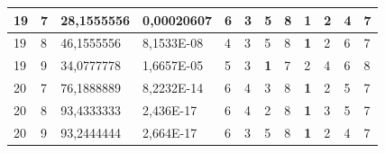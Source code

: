 \documentclass[conference]{IEEEtran}
\begin{document}
\begin{table}[]
\begin{tabular}{|llll|llllllll|}
		\multicolumn{1}{|l|}{19}  & \multicolumn{1}{l|}{7}         & \multicolumn{1}{l|}{28,1555556}    & 0,00020607 & \multicolumn{1}{l|}{6}          & \multicolumn{1}{l|}{3}          & \multicolumn{1}{l|}{5}          & \multicolumn{1}{l|}{8}   & \multicolumn{1}{l|}{\textbf{1}} & \multicolumn{1}{l|}{2}          & \multicolumn{1}{l|}{4}   & 7                      \\ \hline
		\multicolumn{1}{|l|}{19}  & \multicolumn{1}{l|}{8}         & \multicolumn{1}{l|}{46,1555556}    & 8,1533E-08 & \multicolumn{1}{l|}{4}          & \multicolumn{1}{l|}{3}          & \multicolumn{1}{l|}{5}          & \multicolumn{1}{l|}{8}   & \multicolumn{1}{l|}{\textbf{1}} & \multicolumn{1}{l|}{2}          & \multicolumn{1}{l|}{6}   & 7                      \\ \hline
		\multicolumn{1}{|l|}{19}  & \multicolumn{1}{l|}{9}         & \multicolumn{1}{l|}{34,0777778}    & 1,6657E-05 & \multicolumn{1}{l|}{5}          & \multicolumn{1}{l|}{3}          & \multicolumn{1}{l|}{\textbf{1}} & \multicolumn{1}{l|}{7}   & \multicolumn{1}{l|}{2}          & \multicolumn{1}{l|}{4}          & \multicolumn{1}{l|}{6}   & 8                      \\ \hline
		\multicolumn{1}{|l|}{20}  & \multicolumn{1}{l|}{7}         & \multicolumn{1}{l|}{76,1888889}    & 8,2232E-14 & \multicolumn{1}{l|}{6}          & \multicolumn{1}{l|}{4}          & \multicolumn{1}{l|}{3}          & \multicolumn{1}{l|}{8}   & \multicolumn{1}{l|}{\textbf{1}} & \multicolumn{1}{l|}{2}          & \multicolumn{1}{l|}{5}   & 7                      \\ \hline
		\multicolumn{1}{|l|}{20}  & \multicolumn{1}{l|}{8}         & \multicolumn{1}{l|}{93,4333333}    & 2,436E-17  & \multicolumn{1}{l|}{6}          & \multicolumn{1}{l|}{4}          & \multicolumn{1}{l|}{2}          & \multicolumn{1}{l|}{8}   & \multicolumn{1}{l|}{\textbf{1}} & \multicolumn{1}{l|}{3}          & \multicolumn{1}{l|}{5}   & 7                      \\ \hline
		\multicolumn{1}{|l|}{20}  & \multicolumn{1}{l|}{9}         & \multicolumn{1}{l|}{93,2444444}    & 2,664E-17  & \multicolumn{1}{l|}{6}          & \multicolumn{1}{l|}{3}          & \multicolumn{1}{l|}{5}          & \multicolumn{1}{l|}{8}   & \multicolumn{1}{l|}{\textbf{1}} & \multicolumn{1}{l|}{2}          & \multicolumn{1}{l|}{4}   & 7                      \\ \hline
	\end{tabular}
\end{table}
\end{document}

